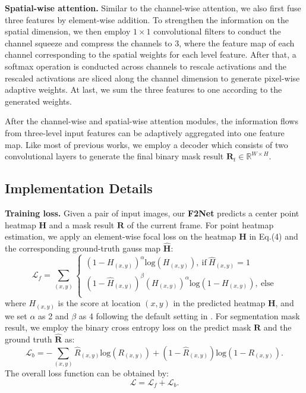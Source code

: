 \documentclass[letterpaper]{article} \usepackage{aaai20}  \usepackage{times}  \usepackage{helvet} \usepackage{courier}  \usepackage[hyphens]{url}  \usepackage{graphicx} \urlstyle{rm} \def\UrlFont{\rm}  \usepackage{graphicx}  \frenchspacing  \setlength{\pdfpagewidth}{8.5in}  \setlength{\pdfpageheight}{11in}  \usepackage{amssymb}
\begin{document}
\noindent \textbf{Spatial-wise attention.} Similar to the channel-wise attention, we also first fuse three features by element-wise addition. To strengthen the information on the spatial dimension, we then employ $1 \times 1$ convolutional filters to conduct the channel squeeze and compress the channels to 3, where the feature map of each channel corresponding to the spatial weights for each level feature. After that, a softmax operation is conducted across channels to rescale activations and the rescaled activations are sliced along the channel dimension to generate pixel-wise adaptive weights. At last, we sum the three features to one according to the generated weights.

After the channel-wise and spatial-wise attention modules, the information flows from three-level input features can be adaptively aggregated into one feature map. Like most of previous works, we employ a decoder which consists of two convolutional layers to generate the final binary mask result $\bm{R}_t \in \mathbb{R}^{W\times H}$.


\subsection{Implementation Details}
\noindent \textbf{Training loss.}
Given a pair of input images, our \textbf{F2Net} predicts a center point heatmap $\bm{H}$ and a mask result $\bm{R}$ of the current frame.
For point heatmap estimation, we apply an element-wise focal loss \cite{lin2017focal} on the heatmap $\bm{H}$ in Eq.(4) and the corresponding ground-truth gauss map $\hat{\bm{H}}$:
\begin{equation}
    \mathcal{L}_{f} = \sum_{(x,y)}\left\{  
             \begin{array}{l}
             (1-H_{(x,y)})^\alpha \text{log}(H_{(x,y)}),\  \text{if}\ \hat{H}_{(x,y)}=1   \\
             (1-\hat{H}_{(x,y)})^\beta (H_{(x,y)})^\alpha \text{log}(1-H_{(x,y)}),\  \text{else} \\  
             \end{array}
\right. 
\end{equation}
where $H_{(x,y)}$ is the score at location $(x, y)$ in the predicted heatmap $\bm{H}$, and we set $\alpha$ as 2 and $\beta$ as 4 following the default setting in \cite{law2018cornernet}. For segmentation mask result, we employ the binary cross entropy loss on the predict mask $\bm{R}$ and the ground truth $\hat{\bm{R}}$ as:
\begin{equation}
    \mathcal{L}_{b} = -\sum_{(x,y)}\hat{R}_{(x,y)}\text{log}(R_{(x,y)})+(1-\hat{R}_{(x,y)})\text{log}(1-R_{(x,y)}).
\end{equation}
The overall loss function can be obtained by:
\begin{equation}
    \mathcal{L} = \mathcal{L}_{f}+\mathcal{L}_{b}.
\end{equation}
\end{document}
